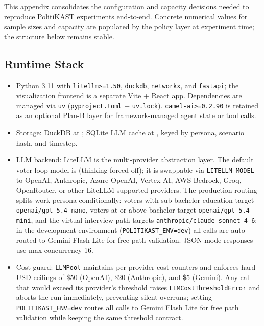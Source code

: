 \documentclass[11pt]{article}
\begin{document}
This appendix consolidates the configuration and capacity decisions needed to reproduce PolitiKAST experiments end-to-end. Concrete numerical values for sample sizes and capacity are populated by the policy layer at experiment time; the structure below remains stable.

\subsection{Runtime Stack}

\begin{itemize}
  \item Python 3.11 with \texttt{litellm>=1.50}, \texttt{duckdb}, \texttt{networkx}, and \texttt{fastapi}; the visualization frontend is a separate Vite + React app. Dependencies are managed via \texttt{uv} (\texttt{pyproject.toml} + \texttt{uv.lock}). \texttt{camel-ai>=0.2.90} is retained as an optional Plan-B layer for framework-managed agent state or tool calls.
  \item Storage: DuckDB at ; SQLite LLM cache at , keyed by persona, scenario hash, and timestep.
  \item LLM backend: LiteLLM is the multi-provider abstraction layer. The default voter-loop model is  (thinking forced off); it is swappable via \texttt{LITELLM\_MODEL} to OpenAI, Anthropic, Azure OpenAI, Vertex AI, AWS Bedrock, Groq, OpenRouter, or other LiteLLM-supported providers. The production routing splits work persona-conditionally: voters with sub-bachelor education target \texttt{openai/gpt-5.4-nano}, voters at or above bachelor target \texttt{openai/gpt-5.4-mini}, and the virtual-interview path targets \texttt{anthropic/claude-sonnet-4-6}; in the development environment (\texttt{POLITIKAST\_ENV=dev}) all calls are auto-routed to Gemini Flash Lite for free path validation. JSON-mode responses use max concurrency 16.
  \item Cost guard: \texttt{LLMPool} maintains per-provider cost counters and enforces hard USD ceilings of \$50 (OpenAI), \$20 (Anthropic), and \$5 (Gemini). Any call that would exceed its provider's threshold raises \texttt{LLMCostThresholdError} and aborts the run immediately, preventing silent overruns; setting \texttt{POLITIKAST\_ENV=dev} routes all calls to Gemini Flash Lite for free path validation while keeping the same threshold contract.
\end{itemize}
\end{document}

